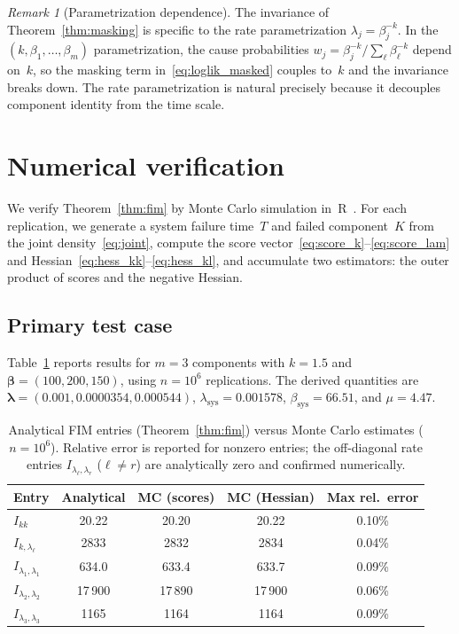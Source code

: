 \documentclass[12pt]{article}
\theoremstyle{remark}
\newtheorem{remark}{Remark}
\newcommand{\lsys}{\lambda_{\mathrm{sys}}}
\newcommand{\bsys}{\beta_{\mathrm{sys}}}
\begin{document}
\begin{remark}[Parametrization dependence]\label{rem:param}
The invariance of Theorem~\ref{thm:masking} is specific to the rate
parametrization $\lambda_j = \beta_j^{-k}$.  In the
$(k, \beta_1, \ldots, \beta_m)$ parametrization, the cause
probabilities $w_j = \beta_j^{-k}/\sum_\ell \beta_\ell^{-k}$ depend
on~$k$, so the masking term in~\eqref{eq:loglik_masked} couples to~$k$
and the invariance breaks down.  The rate parametrization is natural
precisely because it decouples component identity from the time scale.
\end{remark}


\section{Numerical verification}\label{sec:verification}

We verify Theorem~\ref{thm:fim} by Monte Carlo simulation
in~R~\citep{r2025}.  For each replication, we generate a system failure
time~$T$ and failed component~$K$ from the joint
density~\eqref{eq:joint}, compute the score
vector~\eqref{eq:score_k}--\eqref{eq:score_lam} and
Hessian~\eqref{eq:hess_kk}--\eqref{eq:hess_kl}, and accumulate
two estimators: the outer product of scores and the negative Hessian.

\subsection{Primary test case}

Table~\ref{tab:mc} reports results for $m = 3$ components with
$k = 1.5$ and $\bm{\beta} = (100, 200, 150)$, using $n = 10^6$
replications.  The derived quantities are
$\bm{\lambda} = (0.001, 0.0000354, 0.000544)$,
$\lsys = 0.001578$, $\bsys = 66.51$, and $\mu = 4.47$.

\begin{table}[ht]
\centering
\caption{Analytical FIM entries (Theorem~\ref{thm:fim}) versus Monte
  Carlo estimates ($n = 10^6$).  Relative error is reported for nonzero
  entries; the off-diagonal rate entries $I_{\lambda_\ell,\lambda_r}$
  ($\ell \neq r$) are analytically zero and confirmed numerically.}
\label{tab:mc}
\smallskip
\begin{tabular}{@{}lcccc@{}}
\toprule
Entry & Analytical & MC (scores) & MC (Hessian) & Max rel.\ error \\
\midrule
$I_{kk}$                & 20.22 & 20.20 & 20.22 & 0.10\% \\
$I_{k,\lambda_\ell}$    & 2833  & 2832  & 2834  & 0.04\% \\
$I_{\lambda_1,\lambda_1}$ & 634.0 & 633.4 & 633.7 & 0.09\% \\
$I_{\lambda_2,\lambda_2}$ & 17\,900 & 17\,890 & 17\,900 & 0.06\% \\
$I_{\lambda_3,\lambda_3}$ & 1165  & 1164  & 1164  & 0.09\% \\
\bottomrule
\end{tabular}
\end{table}
\end{document}

